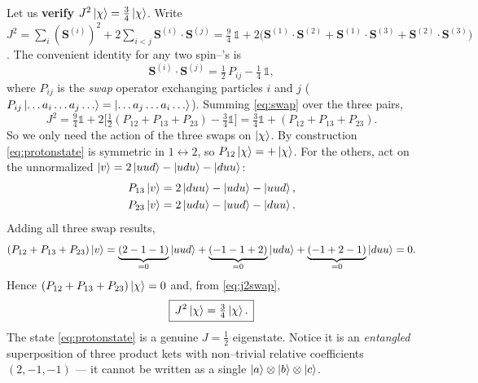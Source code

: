 \documentclass[11pt,oneside]{article}
\newcommand{\halff}{\tfrac{1}{2}}
\newcommand{\id}{\mathbb{1}}
\begin{document}
Let us \textbf{verify} $J^2\ket\chi = \tfrac34\ket\chi$. Write
$J^2 = \sum_{i}(\bm S^{(i)})^2 + 2\sum_{i<j}\bm S^{(i)}\!\cdot\bm S^{(j)}
     = \tfrac94\,\id + 2\big(\bm S^{(1)}\!\cdot\bm S^{(2)}
       + \bm S^{(1)}\!\cdot\bm S^{(3)} + \bm S^{(2)}\!\cdot\bm S^{(3)}\big)$.
The convenient identity for any two spin--\textonehalf's is
\begin{equation}
  \bm S^{(i)}\!\cdot\bm S^{(j)} = \halff\,P_{ij} - \tfrac14\,\id,
  \label{eq:swap}
\end{equation}
where $P_{ij}$ is the \emph{swap} operator exchanging particles $i$ and $j$
($P_{ij}\ket{\dots a_i\dots a_j\dots}=\ket{\dots a_j\dots a_i\dots}$). Summing
\eqref{eq:swap} over the three pairs,
\begin{equation}
  J^2 = \tfrac94\id + 2\Big[\halff(P_{12}+P_{13}+P_{23}) - \tfrac34\id\Big]
      = \tfrac34\id + (P_{12}+P_{13}+P_{23}).
  \label{eq:j2swap}
\end{equation}
So we only need the action of the three swaps on $\ket\chi$. By construction
\eqref{eq:protonstate} is symmetric in $1\!\leftrightarrow\!2$, so
$P_{12}\ket\chi=+\ket\chi$. For the others, act on the unnormalized
$\ket v = 2\ket{uud}-\ket{udu}-\ket{duu}$:
\begin{align}
  P_{13}\ket v &= 2\ket{duu} - \ket{udu} - \ket{uud}, \\
  P_{23}\ket v &= 2\ket{udu} - \ket{uud} - \ket{duu}.
\end{align}
Adding all three swap results,
\begin{equation}
  (P_{12}+P_{13}+P_{23})\ket v
    = \underbrace{(2-1-1)}_{=0}\ket{uud}
    + \underbrace{(-1-1+2)}_{=0}\ket{udu}
    + \underbrace{(-1+2-1)}_{=0}\ket{duu} = 0.
\end{equation}
Hence $(P_{12}+P_{13}+P_{23})\ket\chi = 0$ and, from \eqref{eq:j2swap},
\begin{equation}
  \boxed{\,J^2\ket\chi = \tfrac34\ket\chi.\,}
\end{equation}
The state \eqref{eq:protonstate} is a genuine $J=\tfrac12$ eigenstate. Notice it
is an \emph{entangled} superposition of three product kets with non--trivial
relative coefficients $(2,-1,-1)$ --- it cannot be written as a single
$\ket a\otimes\ket b\otimes\ket c$.
\end{document}
